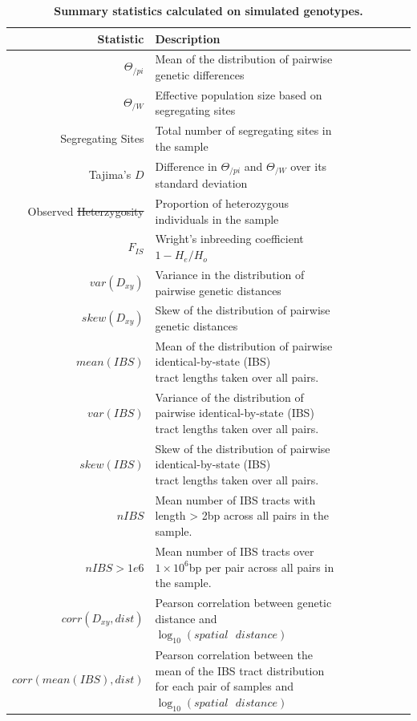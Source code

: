 \documentclass[10pt,twoside,lineno,hidelinks]{preprint} %
\providecommand{\DIFadd}[1]{{\protect\color{blue}\uwave{#1}}} %
\providecommand{\DIFdel}[1]{{\protect\color{red}\sout{#1}}}                      %
\providecommand{\DIFaddend}{} %
\providecommand{\DIFaddFL}[1]{\DIFadd{#1}} %
\providecommand{\DIFdelFL}[1]{\DIFdel{#1}} %
\providecommand{\DIFaddbeginFL}{} %
\providecommand{\DIFaddendFL}{} %
\providecommand{\DIFdelbeginFL}{} %
\providecommand{\DIFdelendFL}{} %
\begin{document}
\DIFaddend \begin{table}
\small
\centering
\caption{\bf Summary statistics calculated on simulated genotypes.}
\begin{tabular}{rllrrrrr}
  \hline
Statistic & Description \\ 
  \hline
$\Theta_{/pi}$ & Mean of the distribution of pairwise genetic differences \\
$\Theta_{/W}$ & Effective population size based on segregating sites \\
Segregating Sites & Total number of segregating sites in the sample \\
Tajima's $D$ & Difference in $\Theta_{/pi}$ and $\Theta_{/W}$ over its standard deviation\\
Observed \DIFdelbeginFL \DIFdelFL{Heterzygosity }\DIFdelendFL \DIFaddbeginFL \DIFaddFL{Heterozygosity }\DIFaddendFL & Proportion of heterozygous individuals in the sample \\
$F_{IS}$ & Wright's inbreeding coefficient $1-H_{e}/H_{o}$ \\
$var(D_{xy})$ & Variance in the distribution of pairwise genetic distances \\
$skew(D_{xy})$ & Skew of the distribution of pairwise genetic distances \\
$mean(IBS)$ & \makecell[l]{Mean of the distribution of pairwise identical-by-state (IBS) \\tract lengths taken over all pairs.} \\
$var(IBS)$ & \makecell[l]{Variance of the distribution of pairwise identical-by-state (IBS) \\tract lengths taken over all pairs.} \\
$skew(IBS)$ & \makecell[l]{Skew of the distribution of pairwise identical-by-state (IBS) \\tract lengths taken over all pairs.} \\
$nIBS$ & Mean number of IBS tracts with length > 2bp across all pairs in the sample. \\
$nIBS>1e6$ & \makecell[l]{Mean number of IBS tracts over $1\times10^6$bp per pair \\across all pairs in the sample.} \\ 
$corr(D_{xy},dist)$ & Pearson correlation between genetic distance and $\log_{10}(spatial\text{ }distance)$ \\
$corr(mean(IBS),dist)$ & \makecell[l]{Pearson correlation between the mean of the IBS tract distribution \\for each pair of samples and $\log_{10}(spatial\text{ }distance)$} \\

\end{tabular}
\end{table}
\end{document}
